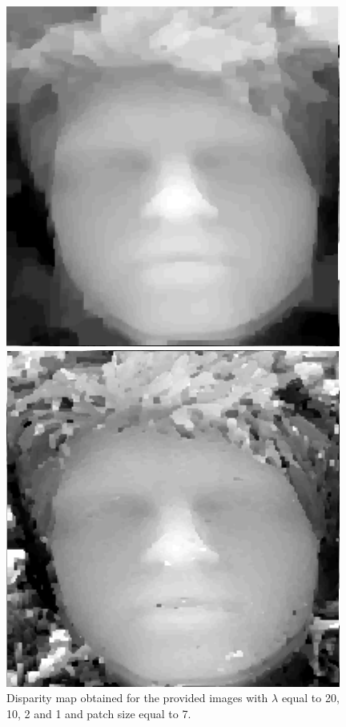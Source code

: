 \documentclass[]{article}
\begin{document}
\begin{figure}[h]
\begin{minipage}{0.24\linewidth}
	\end{minipage}\hfill
	\begin{minipage}{0.24\linewidth}
		\includegraphics[width=\linewidth]{results/thierry_n3_l2.png}
	\end{minipage}\hfill
	\begin{minipage}{0.24\linewidth}
		\includegraphics[width=\linewidth]{results/thierry_n3_l1.png}
	\end{minipage}
	\caption{Disparity map obtained for the provided images with $\lambda$ equal to 20, 10, 2 and 1 and patch size equal to 7.}
	\label{fig:lambda}
\end{figure}
\end{document}
